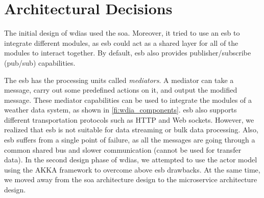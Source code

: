 \section{Architectural Decisions}
\label{se:architectural_decisions}

The initial design of \acrshort{wdias} used the \acrfull{soa}. Moreover, it tried to use an \acrfull{esb} to integrate different modules, as \acrshort{esb} could act as a shared layer for all of the modules to interact together. By default, \acrshort{esb} also provides publisher/subscribe (pub/sub) capabilities.

The \acrshort{esb} has the processing units called \emph{mediators}. A mediator can take a message, carry out some predefined actions on it, and output the modified message. These mediator capabilities can be used to integrate the modules of a weather data system, as shown in \cref{fi:wdia_components}. \acrshort{esb} also supports different transportation protocols such as HTTP and Web sockets. However, we realized that \acrshort{esb} is not suitable for data streaming or bulk data processing. Also, \acrshort{esb} suffers from a single point of failure, as all the messages are going through a common shared bus and slower communication (cannot be used for transfer data). In the second design phase of \acrshort{wdias}, we attempted to use the actor model using the AKKA framework \cite{HewittWhyModel} to overcome above \acrshort{esb} drawbacks. At the same time, we moved away from the \acrshort{soa} architecture design to the microservice architecture design.

